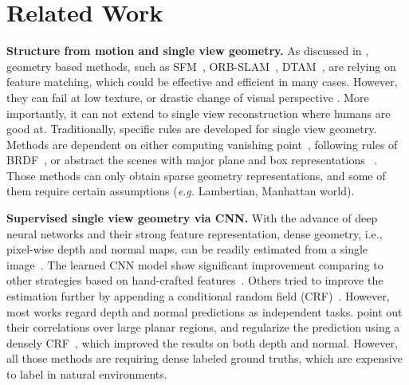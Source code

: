 
\vspace{-0.5\baselineskip}
\section{Related Work}
\label{sec:related}
\vspace{-0.3\baselineskip}

\textbf{Structure from motion and single view geometry.}
As discussed in , geometry based methods, such as SFM~\cite{wu2011visualsfm}, ORB-SLAM~\cite{mur2015orb}, DTAM~\cite{NewcombeLD11}, are relying on feature matching, which could be effective and efficient in many cases. 
However, they can fail at low texture, or drastic change of visual perspective \etc. More importantly, it can not extend to single view reconstruction where humans are good at.
Traditionally, specific rules are developed for single view geometry. Methods are dependent on either computing vanishing point~\cite{HoiemEH07}, following rules of BRDF~\cite{prados2006shape}, or abstract the scenes with major plane and box representations~\cite{DBLP:conf/iccv/SchwingFPU13,DBLP:conf/3dim/SrajerSPP14} \etc. Those methods can only obtain sparse geometry representations, and some of them require certain assumptions (\textit{e.g.} Lambertian, Manhattan world).

\textbf{Supervised single view geometry via CNN.}
With the advance of deep neural networks and their strong feature representation, dense geometry, i.e., pixel-wise depth and normal maps, can be readily estimated from a single image~\cite{wang2015designing,eigen2015predicting,laina2016deeper}. The learned CNN model show significant improvement comparing to other strategies based on hand-crafted features~\cite{karsch2014depth,ladicky2014pulling,zeisl2014discriminatively}. Others tried to improve the estimation further by appending a conditional random field (CRF)~\cite{DBLP:conf/cvpr/WangSLCPY15,Liu_2015_CVPR,li2015depth}. 
However, most works regard depth and normal predictions as independent tasks. \cite{peng2016depth} point out their correlations over large planar regions, and regularize the prediction using a densely CRF~\cite{kong2015intrinsic}, which improved the results on both depth and normal. However, all those methods are requiring dense labeled ground truths, which are expensive to label in natural environments.



